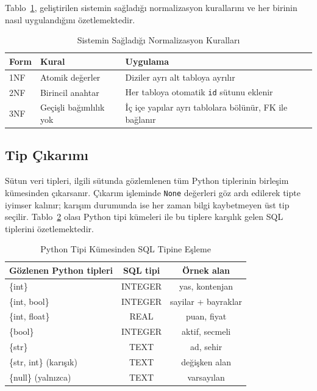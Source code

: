 \documentclass[conference,a4paper,10pt]{IEEEtran}
\begin{document}
Tablo~\ref{tab:nf}, geliştirilen sistemin sağladığı normalizasyon kurallarını ve her birinin nasıl uygulandığını özetlemektedir.

\begin{table}[!ht]
\caption{Sistemin Sağladığı Normalizasyon Kuralları}
\label{tab:nf}
\centering
\footnotesize
\renewcommand{\arraystretch}{1.3}
\begin{tabular}{@{}p{1.4cm}p{2cm}p{3.5cm}@{}}
\toprule
\textbf{Form} & \textbf{Kural} & \textbf{Uygulama} \\
\midrule
1NF & Atomik değerler & Diziler ayrı alt tabloya ayrılır \\
2NF & Birincil anahtar & Her tabloya otomatik \texttt{id} sütunu eklenir \\
3NF & Geçişli bağımlılık yok & İç içe yapılar ayrı tablolara bölünür, FK ile bağlanır \\
\bottomrule
\end{tabular}
\end{table}

\subsection{Tip Çıkarımı}

Sütun veri tipleri, ilgili sütunda gözlemlenen tüm Python tiplerinin birleşim kümesinden çıkarsanır. Çıkarım işleminde \texttt{None} değerleri göz ardı edilerek tipte iyimser kalınır; karışım durumunda ise her zaman bilgi kaybetmeyen üst tip seçilir. Tablo~\ref{tab:tip} olası Python tipi kümeleri ile bu tiplere karşılık gelen SQL tiplerini özetlemektedir.

\begin{table}[!ht]
\caption{Python Tipi Kümesinden SQL Tipine Eşleme}
\label{tab:tip}
\centering
\footnotesize
\renewcommand{\arraystretch}{1.2}
\begin{tabular}{@{}lcc@{}}
\toprule
\textbf{Gözlenen Python tipleri} & \textbf{SQL tipi} & \textbf{Örnek alan} \\
\midrule
\{int\}                       & INTEGER & yas, kontenjan \\
\{int, bool\}                 & INTEGER & sayilar + bayraklar \\
\{int, float\}                & REAL    & puan, fiyat \\
\{bool\}                      & INTEGER & aktif, secmeli \\
\{str\}                       & TEXT    & ad, sehir \\
\{str, int\} (karışık)        & TEXT    & değişken alan \\
\{null\} (yalnızca)           & TEXT    & varsayılan \\
\bottomrule
\end{tabular}
\end{table}
\end{document}
